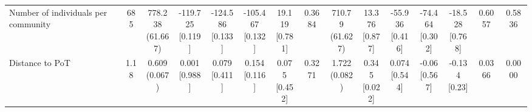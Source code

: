 {\begin{tabular}[t]{lcccccccccccccc}
Number of individuals per community & 685 & \makecell[c]{778.238\\(61.667)} & \makecell[c]{-119.725\\{[0.119]}} & \makecell[c]{-124.586\\{[0.133]}} & \makecell[c]{-105.467\\{[0.132]}} & \makecell[c]{19.119\\{[0.781]}} & 0.3684 & \makecell[c]{710.79\\(61.627)} & \makecell[c]{13.376\\{[0.877]}} & \makecell[c]{-55.936\\{[0.416]}} & \makecell[c]{-74.464\\{[0.302]}} & \makecell[c]{-18.528\\{[0.768]}} & 0.6057 & 0.5836\\
Distance to PoT & 1.18 & \makecell[c]{0.609\\(0.067)} & \makecell[c]{0.001\\{[0.988]}} & \makecell[c]{0.079\\{[0.411]}} & \makecell[c]{0.154\\{[0.116]}} & \makecell[c]{0.075\\{[0.452]}} & 0.3271 & \makecell[c]{1.722\\(0.082)} & \makecell[c]{0.345\\{[0.022]}} & \makecell[c]{0.074\\{[0.544]}} & \makecell[c]{-0.06\\{[0.567]}} & \makecell[c]{-0.134\\{[0.23]}} & 0.0366 & 0.0000\\
\bottomrule
\end{tabular}}

